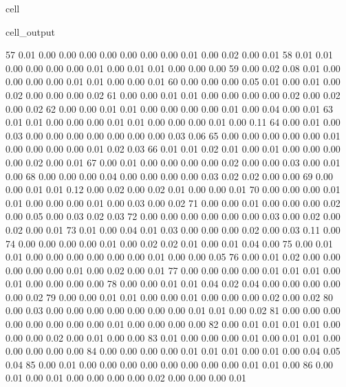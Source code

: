 \documentclass[letterpaper,10pt,english]{jupyterBook}
\begin{document}
\begin{sphinxuseclass}{cell}
\begin{sphinxVerbatimOutput}
\begin{sphinxuseclass}{cell_output}
\begin{sphinxVerbatim}[commandchars=\\\{\}]
        57	0.01 	0.00 	0.00 	0.00 	0.00 	0.00 	0.00 	0.00 	0.01 	0.00 	0.02 	0.00 	0.01
        58	0.01 	0.01 	0.00 	0.00 	0.00 	0.00 	0.01 	0.00 	0.01 	0.01 	0.00 	0.00 	0.00
        59	0.00 	0.02 	0.08 	0.01 	0.00 	0.00 	0.00 	0.00 	0.01 	0.01 	0.00 	0.00 	0.01
        60	0.00 	0.00 	0.00 	0.05 	0.01 	0.00 	0.01 	0.00 	0.02 	0.00 	0.00 	0.00 	0.02
        61	0.00 	0.00 	0.01 	0.01 	0.00 	0.00 	0.00 	0.00 	0.02 	0.00 	0.02 	0.00 	0.02
        62	0.00 	0.00 	0.01 	0.01 	0.00 	0.00 	0.00 	0.00 	0.01 	0.00 	0.04 	0.00 	0.01
        63	0.01 	0.01 	0.00 	0.00 	0.00 	0.01 	0.01 	0.00 	0.00 	0.00 	0.01 	0.00 	0.11
        64	0.00 	0.01 	0.00 	0.03 	0.00 	0.00 	0.00 	0.00 	0.00 	0.00 	0.00 	0.03 	0.06
        65	0.00 	0.00 	0.00 	0.00 	0.00 	0.01 	0.00 	0.00 	0.00 	0.00 	0.01 	0.02 	0.03
        66	0.01 	0.01 	0.02 	0.01 	0.00 	0.01 	0.00 	0.00 	0.00 	0.00 	0.02 	0.00 	0.01
        67	0.00 	0.01 	0.00 	0.00 	0.00 	0.00 	0.02 	0.00 	0.00 	0.03 	0.00 	0.01 	0.00
        68	0.00 	0.00 	0.00 	0.04 	0.00 	0.00 	0.00 	0.00 	0.03 	0.02 	0.02 	0.00 	0.00
        69	0.00 	0.00 	0.01 	0.01 	0.12 	0.00 	0.02 	0.00 	0.02 	0.01 	0.00 	0.00 	0.01
        70	0.00 	0.00 	0.00 	0.01 	0.01 	0.00 	0.00 	0.00 	0.01 	0.00 	0.03 	0.00 	0.02
        71	0.00 	0.00 	0.01 	0.00 	0.00 	0.00 	0.02 	0.00 	0.05 	0.00 	0.03 	0.02 	0.03
        72	0.00 	0.00 	0.00 	0.00 	0.00 	0.00 	0.03 	0.00 	0.02 	0.00 	0.02 	0.00 	0.01
        73	0.01 	0.00 	0.04 	0.01 	0.03 	0.00 	0.00 	0.00 	0.02 	0.00 	0.03 	0.11 	0.00
        74	0.00 	0.00 	0.00 	0.00 	0.01 	0.00 	0.02 	0.02 	0.01 	0.00 	0.01 	0.04 	0.00
        75	0.00 	0.01 	0.01 	0.00 	0.00 	0.00 	0.00 	0.00 	0.00 	0.01 	0.00 	0.00 	0.05
        76	0.00 	0.01 	0.02 	0.00 	0.00 	0.00 	0.00 	0.00 	0.01 	0.00 	0.02 	0.00 	0.01
        77	0.00 	0.00 	0.00 	0.00 	0.01 	0.01 	0.01 	0.00 	0.01 	0.00 	0.00 	0.00 	0.00
        78	0.00 	0.00 	0.01 	0.01 	0.04 	0.02 	0.04 	0.00 	0.00 	0.00 	0.00 	0.00 	0.02
        79	0.00 	0.00 	0.01 	0.01 	0.00 	0.00 	0.01 	0.00 	0.00 	0.00 	0.02 	0.00 	0.02
        80	0.00 	0.03 	0.00 	0.00 	0.00 	0.00 	0.00 	0.00 	0.00 	0.01 	0.01 	0.00 	0.02
        81	0.00 	0.00 	0.00 	0.00 	0.00 	0.00 	0.00 	0.00 	0.01 	0.00 	0.00 	0.00 	0.00
        82	0.00 	0.01 	0.01 	0.01 	0.01 	0.00 	0.00 	0.00 	0.02 	0.00 	0.01 	0.00 	0.00
        83	0.01 	0.00 	0.00 	0.00 	0.01 	0.00 	0.01 	0.01 	0.00 	0.00 	0.00 	0.00 	0.00
        84	0.00 	0.00 	0.00 	0.00 	0.01 	0.01 	0.01 	0.00 	0.01 	0.00 	0.04 	0.05 	0.04
        85	0.00 	0.01 	0.00 	0.00 	0.00 	0.00 	0.00 	0.00 	0.00 	0.00 	0.01 	0.01 	0.00
        86	0.00 	0.01 	0.00 	0.01 	0.00 	0.00 	0.00 	0.00 	0.02 	0.00 	0.00 	0.00 	0.01

\end{sphinxVerbatim}
\end{sphinxuseclass}
\end{sphinxVerbatimOutput}
\end{sphinxuseclass}
\end{document}
